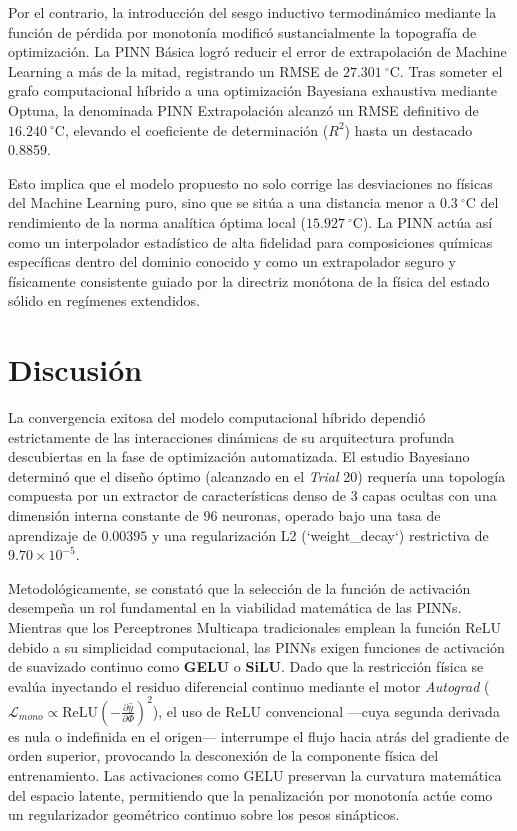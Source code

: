 \documentclass[a4paper, 12pt, twocolumn]{book}
\begin{document}
Por el contrario, la introducción del sesgo inductivo termodinámico mediante la función de pérdida por monotonía modificó sustancialmente la topografía de optimización. La PINN Básica logró reducir el error de extrapolación de Machine Learning a más de la mitad, registrando un RMSE de $27.301\ ^\circ\text{C}$. Tras someter el grafo computacional híbrido a una optimización Bayesiana exhaustiva mediante Optuna, la denominada PINN Extrapolación alcanzó un RMSE definitivo de $16.240\ ^\circ\text{C}$, elevando el coeficiente de determinación ($R^2$) hasta un destacado 0.8859. 

Esto implica que el modelo propuesto no solo corrige las desviaciones no físicas del Machine Learning puro, sino que se sitúa a una distancia menor a $0.3\ ^\circ\text{C}$ del rendimiento de la norma analítica óptima local ($15.927\ ^\circ\text{C}$). La PINN actúa así como un interpolador estadístico de alta fidelidad para composiciones químicas específicas dentro del dominio conocido y como un extrapolador seguro y físicamente consistente guiado por la directriz monótona de la física del estado sólido en regímenes extendidos.

\section{Discusión}

La convergencia exitosa del modelo computacional híbrido dependió estrictamente de las interacciones dinámicas de su arquitectura profunda descubiertas en la fase de optimización automatizada. El estudio Bayesiano determinó que el diseño óptimo (alcanzado en el \textit{Trial} 20) requería una topología compuesta por un extractor de características denso de 3 capas ocultas con una dimensión interna constante de 96 neuronas, operado bajo una tasa de aprendizaje de $0.00395$ y una regularización L2 (`weight\_decay`) restrictiva de $9.70 \times 10^{-5}$.

Metodológicamente, se constató que la selección de la función de activación desempeña un rol fundamental en la viabilidad matemática de las PINNs. Mientras que los Perceptrones Multicapa tradicionales emplean la función ReLU debido a su simplicidad computacional, las PINNs exigen funciones de activación de suavizado continuo como \textbf{GELU} o \textbf{SiLU}. Dado que la restricción física se evalúa inyectando el residuo diferencial continuo mediante el motor \textit{Autograd} ($\mathcal{L}_{mono} \propto \text{ReLU}(-\frac{\partial \hat{y}}{\partial \Phi})^2$), el uso de ReLU convencional —cuya segunda derivada es nula o indefinida en el origen— interrumpe el flujo hacia atrás del gradiente de orden superior, provocando la desconexión de la componente física del entrenamiento. Las activaciones como GELU preservan la curvatura matemática del espacio latente, permitiendo que la penalización por monotonía actúe como un regularizador geométrico continuo sobre los pesos sinápticos.
\end{document}
